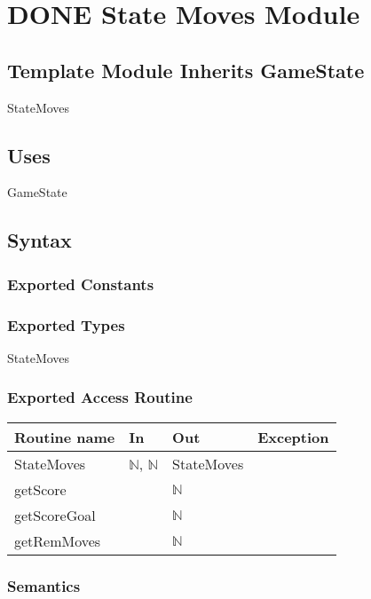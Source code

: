 \documentclass[11pt]{article}
\begin{document}
\section{{\bfseries\sffamily DONE} State Moves Module}
\label{sec:org108d3c6}
\subsection*{Template Module Inherits GameState}
\label{sec:org1e79d7f}
StateMoves

\subsection*{Uses}
\label{sec:org8bdb4d1}
GameState

\subsection*{Syntax}
\label{sec:org4376df6}

\subsubsection*{Exported Constants}
\label{sec:org367d99e}

\subsubsection*{Exported Types}
\label{sec:orgfc195e2}
StateMoves

\subsubsection*{Exported Access Routine}
\label{sec:org6856a0b}
\begin{center}
\begin{tabular}{l|l|l|l|}
Routine name & In & Out & Exception\\
\hline
StateMoves & \(\mathbb{N}\), \(\mathbb{N}\) & StateMoves & \\
getScore &  & \(\mathbb{N}\) & \\
getScoreGoal &  & \(\mathbb{N}\) & \\
getRemMoves &  & \(\mathbb{N}\) & \\
\end{tabular}
\end{center}

\subsubsection*{Semantics}
\label{sec:org4be8bd6}
\end{document}
